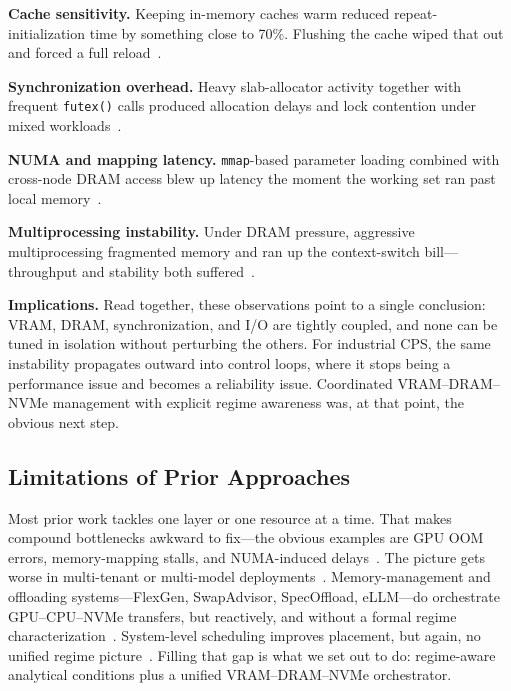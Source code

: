 \textbf{Cache sensitivity.}
Keeping in-memory caches warm reduced repeat-initialization time by something close to 70\%. Flushing the cache wiped that out and forced a full reload~\cite{swapAdvisor2020,chen2023cpugpu}.

\textbf{Synchronization overhead.}
Heavy slab-allocator activity together with frequent \texttt{futex()} calls produced allocation delays and lock contention under mixed workloads~\cite{hunter2021hugepage,yang2023numalloc}.

\textbf{NUMA and mapping latency.}
\texttt{mmap}-based parameter loading combined with cross-node DRAM access blew up latency the moment the working set ran past local memory~\cite{li2024llmserving}.

\textbf{Multiprocessing instability.}
Under DRAM pressure, aggressive multiprocessing fragmented memory and ran up the context-switch bill---throughput and stability both suffered~\cite{sarkar2023edgemoe}.

\textbf{Implications.}
Read together, these observations point to a single conclusion: VRAM, DRAM, synchronization, and I/O are tightly coupled, and none can be tuned in isolation without perturbing the others.
For industrial CPS, the same instability propagates outward into control loops, where it stops being a performance issue and becomes a reliability issue. Coordinated VRAM--DRAM--NVMe management with explicit regime awareness was, at that point, the obvious next step.

\subsection{Limitations of Prior Approaches}

Most prior work tackles one layer or one resource at a time. That makes compound bottlenecks awkward to fix---the obvious examples are GPU OOM errors, memory-mapping stalls, and NUMA-induced delays~\cite{swapAdvisor2020,milic2017socket,sarkar2023edgemoe}.
The picture gets worse in multi-tenant or multi-model deployments~\cite{kwon2023pagedattention,du2025prefillonly,li2024llmserving}.
Memory-management and offloading systems---FlexGen, SwapAdvisor, SpecOffload, eLLM---do orchestrate GPU--CPU--NVMe transfers, but reactively, and without a formal regime characterization~\cite{sheng2023flexgen,swapAdvisor2020,xu2025ellm}.
System-level scheduling improves placement, but again, no unified regime picture~\cite{milic2017socket,stojkovic2025dynamollm,wang2024swapnet,kotegawa2025revisiting}.
Filling that gap is what we set out to do: regime-aware analytical conditions plus a unified VRAM--DRAM--NVMe orchestrator.
